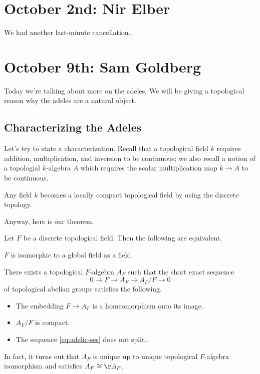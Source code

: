 \documentclass{article}
\begin{document}
\section{October 2nd: Nir Elber}
We had another last-minute cancellation.

\section{October 9th: Sam Goldberg}
Today we're talking about more on the adeles. We will be giving a topological reason why the adeles are a natural object.

\subsection{Characterizing the Adeles}
Let's try to state a characterization. Recall that a topological field $k$ requires addition, multiplication, and inversion to be continuous; we also recall a notion of a topologial $k$-algebra $A$ which requires the scalar multiplication map $k\to A$ to be continuous.
\begin{example}
	Any field $k$ becomes a locally compact topological field by using the discrete topology.
\end{example}
Anyway, here is our theorem.
\begin{theorem}
	Let $F$ be a discrete topological field. Then the following are equivalent.
	\begin{listalph}
		\item $F$ is isomorphic to a global field as a field.
		\item There exists a topological $F$-algebra $A_F$ such that the short exact sequence
		\begin{equation}
			0\to F\to A_F\to A_F/F\to0 \label{eq:adelic-ses}
		\end{equation}
		of topological abelian groups satisfies the following.
		\begin{itemize}
			\item The embedding $F\to A_F$ is a homeomorphism onto its image.
			\item $A_F/F$ is compact.
			\item The sequence \eqref{eq:adelic-ses} does not split.
		\end{itemize}
	\end{listalph}
	In fact, it turns out that $A_F$ is unique up to unique topological $F$-algebra isomorphism and satisfies $A_F\cong\AA_F$.
\end{theorem}
\end{document}
